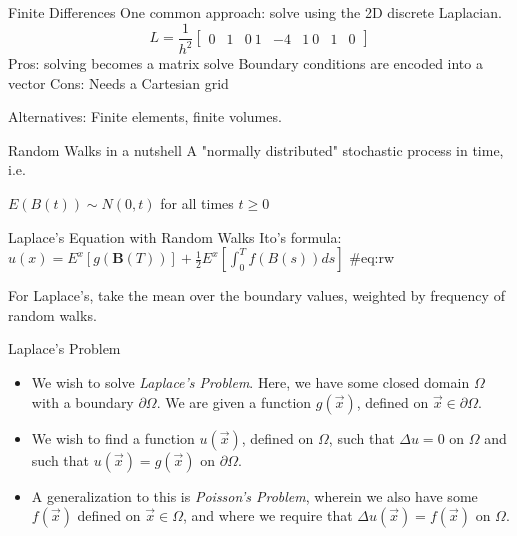 \documentclass{beamer}
\newcommand\di\partial
\newcommand\pars[1]{\left(#1\right)}
\begin{document}
\begin{frame}{Finite Differences}
One common approach: solve using the 2D discrete Laplacian.
	\[ L = \frac{1}{h^2} \begin{bmatrix} 
		0 & 1 & 0 \
		1 & -4& 1 \
		0 & 1 & 0 
	\end{bmatrix} \]
Pros: solving becomes a matrix solve
Boundary conditions are encoded into a vector
Cons: Needs a Cartesian grid

Alternatives: Finite elements, finite volumes.
\end{frame}
\begin{frame}{Random Walks in a nutshell}
A "normally distributed" stochastic process in time, i.e.
	
$E(B(t)) \sim N(0, t)$ for all times $t \geq 0$
\end{frame}

\begin{frame}{Laplace's Equation with Random Walks}
Ito's formula:
$u(x) = E^x[ g(\mathbf{B}(T))] + \frac{1}{2} E^x \left[ \int_0^T f(B(s))ds \right]$ {#eq:rw}

For Laplace's, take the mean over the boundary values, weighted by frequency of random walks.
\end{frame}



\begin{frame}{Laplace's Problem}
\begin{itemize}
\item We wish to solve \emph{Laplace's Problem}.
Here, we have some closed domain $\Omega$ with a boundary $\di\Omega$.
We are given a function $g\pars{\vec{x}}$, defined on $\vec{x}\in\di\Omega$.
\item We wish to find a function $u\pars{\vec{x}}$, defined on $\Omega$,
such that $\Delta u=0$ on $\Omega$
and such that $u\pars{\vec{x}}=g\pars{\vec{x}}$ on $\di\Omega$.
\item A generalization to this is \emph{Poisson's Problem},
wherein we also have some $f\pars{\vec{x}}$ defined on $\vec{x}\in\Omega$,
and where we require that $\Delta u\pars{\vec{x}}=f\pars{\vec{x}}$ on $\Omega$.
\end{itemize}
\end{frame}
\end{document}
